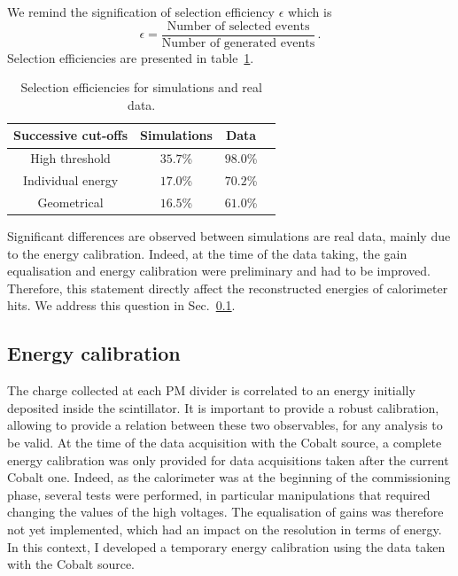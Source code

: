 We remind the signification of selection efficiency $\epsilon$ which is
\begin{equation}
  \epsilon = \frac{\text{Number of selected events}}{\text{Number of generated events}}\,.
\end{equation}
Selection efficiencies are presented in table~\ref{tab:Co_cut_eff}.
\begin{table}[h]
  \centering
  \begin{tabular}{|c|c|c|c|}
    \hline
    Successive cut-offs & Simulations & Data \\
    \hline\hline
    High threshold & $35.7$\% & $98.0$\% \\
    Individual energy & $17.0$\% & $70.2$\% \\
    Geometrical & $16.5$\% & $61.0$\% \\
    \hline
  \end{tabular}
  \caption{Selection efficiencies for simulations and real data.
    \label{tab:Co_cut_eff}}
\end{table}
Significant differences are observed between simulations are real data, mainly due to the energy calibration.
Indeed, at the time of the data taking, the gain equalisation and energy calibration were preliminary and had to be improved.
Therefore, this statement directly affect the reconstructed energies of calorimeter hits.
We address this question in Sec.~\ref{subsec:Co_energy_calib}.



\subsection{Energy calibration}
\label{subsec:Co_energy_calib}

The charge collected at each PM divider is correlated to an energy initially deposited inside the scintillator.
It is important to provide a robust calibration, allowing to provide a relation between these two observables, for any analysis to be valid.
At the time of the data acquisition with the Cobalt source, a complete energy calibration was only provided for data acquisitions taken after the current Cobalt one.
Indeed, as the calorimeter was at the beginning of the commissioning phase, several tests were performed, in particular manipulations that required changing the values of the high voltages.
The equalisation of gains was therefore not yet implemented, which had an impact on the resolution in terms of energy.
In this context, I developed a temporary energy calibration using the data taken with the Cobalt source.

